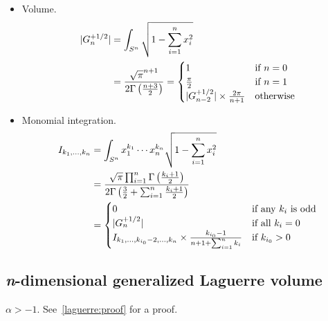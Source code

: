 \documentclass[final]{scrartcl}
\begin{document}
\begin{itemize}
  \item Volume.
    \begin{align}\nonumber
    |G_n^{+1/2}|
      &= \int_{S^n} \sqrt{1 - \sum_{i=1}^n x_i^2}\\
      &= \frac{%
        \sqrt{\pi}^{n+1}
      }{%
        2\Gamma\left(\frac{n+3}{2}\right)
      }
      = \begin{cases}
        1&\text{if $n=0$}\\
        \frac{\pi}{2}&\text{if $n=1$}\\
        |G_{n-2}^{+1/2}| \times \frac{2\pi}{n+1}&\text{otherwise}
      \end{cases}
    \end{align}

  \item Monomial integration.
    \begin{align}\nonumber
    I_{k_1,\dots,k_n}
      &= \int_{S^n} x_1^{k_1}\cdots x_n^{k_n} \sqrt{1 - \sum_{i=1}^n
      x_i^2}\\
      &= \frac{%
        \sqrt{\pi}\prod_{i=1}^n \Gamma\left(\frac{k_i+1}{2}\right)
      }{%
        2\Gamma\left(\frac{3}{2} + \sum_{i=1}^n \frac{k_i+1}{2}\right)
      }\\
      &= \begin{cases}
        0&\text{if any $k_i$ is odd}\\
        |G_n^{+1/2}|&\text{if all $k_i=0$}\\
        I_{k_1,\dots,k_{i_0}-2,\dots,k_n} \times \frac{k_{i_0}-1}{n + 1 + \sum_{i=1}^n k_i}&\text{if $k_{i_0} > 0$}
      \end{cases}
    \end{align}
\end{itemize}


\subsection*{\textit{n}-dimensional generalized Laguerre volume}

$\alpha > -1$. See~\ref{laguerre:proof} for a proof.
\end{document}
